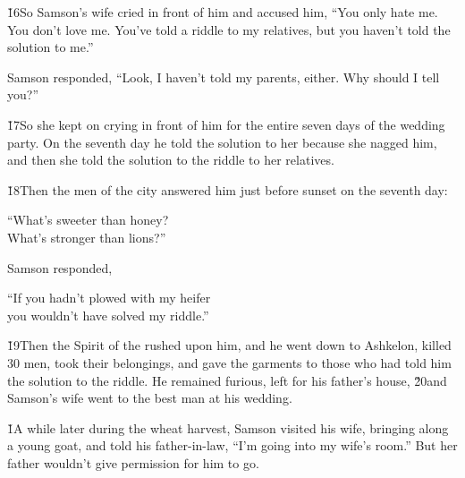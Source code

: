 \v{16}So Samson's wife cried in front of him and accused him, ``You only hate me. You don't love me. You've told a riddle to my relatives, but you haven't told the solution to me.''

Samson responded, ``Look, I haven't told my parents, either. Why should I tell you?''

\v{17}So she kept on crying in front of him for the entire seven days of the wedding party. On the seventh day he told the solution to her because she nagged him, and then she told the solution to the riddle to her relatives.

\v{18}Then the men of the city answered him just before sunset on the seventh day:

\begin{poetry}
\poeml ``What's sweeter than honey? \\
\poemll    What's stronger than lions?''
\end{poetry}

Samson responded,

\begin{poetry}
\poeml ``If you hadn't plowed with my heifer \\
\poemll    you wouldn't have solved my riddle.''
\end{poetry}

\v{19}Then the Spirit of the  rushed upon him, and he went down to Ashkelon, killed 30 men, took their belongings, and gave the garments to those who had told him the solution to the riddle. He remained furious, left for his father's house, \v{20}and Samson's wife went to the best man at his wedding.

\v{1}A while later during the wheat harvest, Samson visited his wife, bringing along a young goat, and told his father-in-law, ``I'm going into my wife's room.'' But her father wouldn't give permission for him to go.

